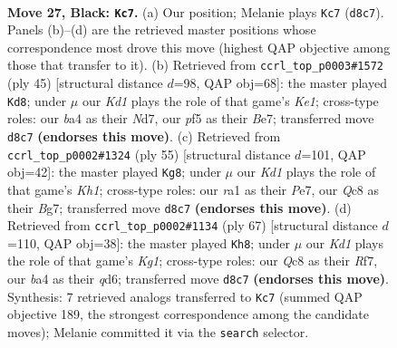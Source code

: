 \documentclass[11pt]{article}
\begin{document}
\clearpage

\begin{figure}[p]\centering
\begin{subfigure}{0.46\textwidth}\centering
\resizebox{\linewidth}{!}{%
\newchessgame
\chessboard[
  setfen={r1qk3r/p4pp1/5n1p/5P1P/B2Q3b/8/4K1p1/R1B3N1 b - - 1 27},
  showmover=false,
  pgfstyle=straightmove, color=movearrow, markmove={d8-c7}
]}
\caption{}
\end{subfigure}\hfill
\begin{subfigure}{0.46\textwidth}\centering
\resizebox{\linewidth}{!}{%
\newchessgame
\chessboard[
  setfen={r3k2r/1p1nb2p/p1p2q2/2P4B/1P1NQ3/8/P4PP1/3RK3 b kq - 2 23},
  showmover=false,
  pgfstyle=straightmove, color=movearrow, markmove={e8-d8}
]}
\caption{}
\end{subfigure}
\\[4pt]
\begin{subfigure}{0.46\textwidth}\centering
\resizebox{\linewidth}{!}{%
\newchessgame
\chessboard[
  setfen={r6k/1p2p1b1/2p3Nn/p2n4/3PB3/1P4Pq/2Q5/2B2RK1 b - - 2 28},
  showmover=false,
  pgfstyle=straightmove, color=movearrow, markmove={h8-g8}
]}
\caption{}
\end{subfigure}\hfill
\begin{subfigure}{0.46\textwidth}\centering
\resizebox{\linewidth}{!}{%
\newchessgame
\chessboard[
  setfen={2r3k1/1p3r2/p2Q2Rp/2q5/4Bp1p/7P/P4P1K/8 b - - 2 34},
  showmover=false,
  pgfstyle=straightmove, color=movearrow, markmove={g8-h8}
]}
\caption{}
\end{subfigure}
\caption{\textbf{Move 27, Black: \texttt{Kc7}.} (a) Our position; Melanie plays \texttt{Kc7} (\texttt{d8c7}). Panels (b)--(d) are the retrieved master positions whose correspondence most drove this move (highest QAP objective among those that transfer to it). (b) Retrieved from \texttt{ccrl\_top\_p0003\#1572} (ply 45) [structural distance $d$=98, QAP obj=68]: the master played \texttt{Kd8}; under $\mu$ our \emph{Kd1} plays the role of that game's \emph{Ke1}; cross-type roles: our \emph{b}a4 as their \emph{N}d7, our \emph{p}f5 as their \emph{B}e7; transferred move \texttt{d8c7} \textbf{(endorses this move)}. (c) Retrieved from \texttt{ccrl\_top\_p0002\#1324} (ply 55) [structural distance $d$=101, QAP obj=42]: the master played \texttt{Kg8}; under $\mu$ our \emph{Kd1} plays the role of that game's \emph{Kh1}; cross-type roles: our \emph{r}a1 as their \emph{P}e7, our \emph{Q}c8 as their \emph{B}g7; transferred move \texttt{d8c7} \textbf{(endorses this move)}. (d) Retrieved from \texttt{ccrl\_top\_p0002\#1134} (ply 67) [structural distance $d$=110, QAP obj=38]: the master played \texttt{Kh8}; under $\mu$ our \emph{Kd1} plays the role of that game's \emph{Kg1}; cross-type roles: our \emph{Q}c8 as their \emph{R}f7, our \emph{b}a4 as their \emph{q}d6; transferred move \texttt{d8c7} \textbf{(endorses this move)}. Synthesis: 7 retrieved analogs transferred to \texttt{Kc7} (summed QAP objective 189, the strongest correspondence among the candidate moves); Melanie committed it via the \texttt{search} selector.}
\label{fig:thought-m53}
\end{figure}
\end{document}
